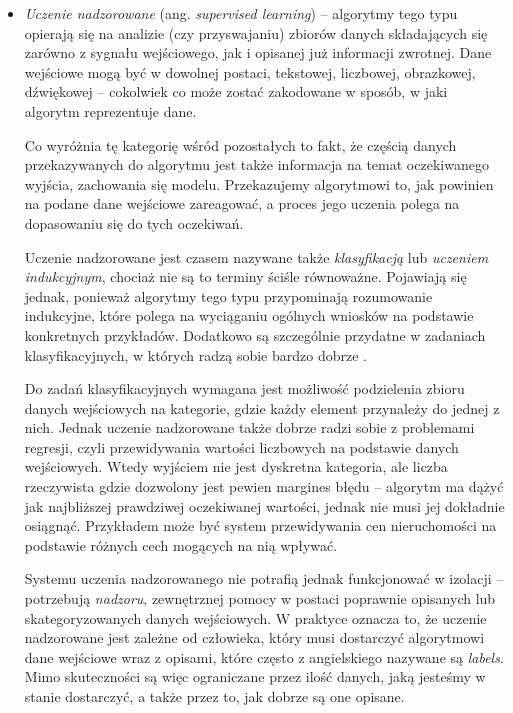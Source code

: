 \begin{itemize}

  \item \emph{Uczenie nadzorowane} (ang. \emph{supervised learning}) --
        algorytmy tego typu opierają się na analizie (czy przyswajaniu) zbiorów danych składających się zarówno z sygnału wejściowego, jak i opisanej już informacji zwrotnej.
        Dane wejściowe mogą być w dowolnej postaci, tekstowej, liczbowej, obrazkowej, dźwiękowej -- cokolwiek co może zostać zakodowane w sposób, w jaki algorytm reprezentuje dane.

        Co wyróżnia tę kategorię wśród pozostałych to fakt, że częścią danych przekazywanych do algorytmu jest także informacja na temat oczekiwanego wyjścia, zachowania się modelu.
        Przekazujemy algorytmowi to, jak powinien na podane dane wejściowe zareagować, a proces jego uczenia polega na dopasowaniu się do tych oczekiwań.

        Uczenie nadzorowane jest czasem nazywane także \emph{klasyfikacją} lub \emph{uczeniem indukcyjnym}, chociaż nie są to terminy ściśle równoważne.
        Pojawiają się jednak, ponieważ algorytmy tego typu przypominają rozumowanie indukcyjne, które polega na wyciąganiu ogólnych wniosków na podstawie konkretnych przykładów.
        Dodatkowo są szczególnie przydatne w zadaniach klasyfikacyjnych, w których radzą sobie bardzo dobrze \cite{hastie2009overview}.

        Do zadań klasyfikacyjnych wymagana jest możliwość podzielenia zbioru danych wejściowych na kategorie, gdzie każdy element przynależy do jednej z nich.
        Jednak uczenie nadzorowane także dobrze radzi sobie z problemami regresji, czyli przewidywania wartości liczbowych na podstawie danych wejściowych.
        Wtedy wyjściem nie jest dyskretna kategoria, ale liczba rzeczywista gdzie dozwolony jest pewien margines błędu -- algorytm ma dążyć jak najbliższej prawdziwej oczekiwanej wartości, jednak nie musi jej dokładnie osiągnąć.
        Przykładem może być system przewidywania cen nieruchomości na podstawie różnych cech mogących na nią wpływać.

        Systemu uczenia nadzorowanego nie potrafią jednak funkcjonować w izolacji -- potrzebują \emph{nadzoru}, zewnętrznej pomocy w postaci poprawnie opisanych lub skategoryzowanych danych wejściowych.
        W praktyce oznacza to, że uczenie nadzorowane jest zależne od człowieka, który musi dostarczyć algorytmowi dane wejściowe wraz z opisami, które często z angielskiego nazywane są \emph{labels}.
        Mimo skuteczności są więc ograniczane przez ilość danych, jaką jesteśmy w stanie dostarczyć, a także przez to, jak dobrze są one opisane.


\end{itemize}
